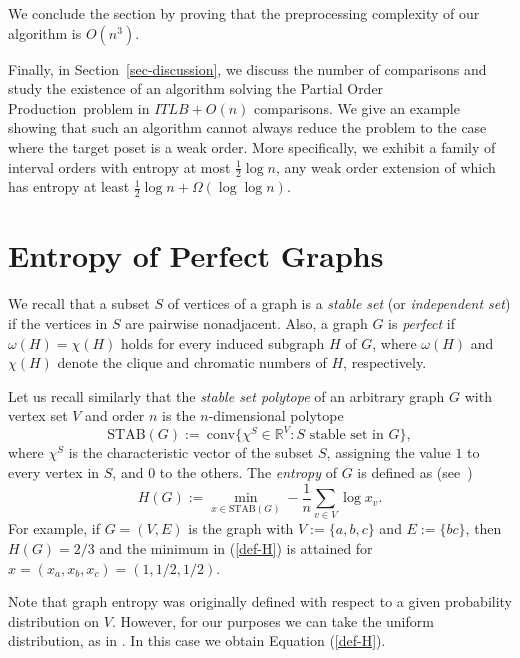 \documentclass[12pt,oneside]{article}
\newcommand{\partsort}{{\sc Partial Order Production}}
\newcommand{\STAB}{\mathrm{STAB}}
\begin{document}
We conclude the section by proving that the preprocessing complexity of our algorithm is $O(n^3)$.\smallskip

Finally, in Section~\ref{sec-discussion}, we discuss {the number of comparisons and study} the existence of an algorithm solving the \partsort\ problem in $ITLB + O(n)$ comparisons. We give an example showing that such an algorithm cannot always reduce the problem to the case where the target poset is a weak order. More specifically, we exhibit a family of interval orders with entropy at most $\frac{1}{2}\log n$, any weak order extension of which has entropy at least $\frac{1}{2}\log n + \Omega(\log \log n)$.

\section{Entropy of Perfect Graphs}
\label{sec-perfect-graphs}
We recall that a subset $S$ of vertices of a graph is a \emph{stable set} (or {\em independent set}) if the vertices in $S$ are pairwise nonadjacent. Also, a graph $G$ is {\em perfect} if $\omega(H)=\chi(H)$ holds for every induced
subgraph $H$ of $G$, where $\omega(H)$ and $\chi(H)$ denote the
clique and chromatic numbers of $H$, respectively.

Let us recall similarly that the {\em stable set polytope\/} of an arbitrary graph $G$ with vertex set $V$ and order $n$ is the $n$-dimensional polytope
\begin{equation*}
\STAB(G) := \mathrm{\ conv} \{\chi^S \in \mathbb{R}^V : S \textrm{ stable set in }G\},
\end{equation*}
where $\chi^S$ is the characteristic vector of the subset $S$, assigning the value $1$ to every vertex in $S$, and $0$ to the others. The {\em entropy\/} of $G$ is defined as (see~\cite{K73,CKLMS90})
\begin{equation}
\label{def-H}
H(G) := \min_{x\in \STAB(G)} - \frac 1n \sum_{v\in V} \log x_v.
\end{equation}
For example, if $G=(V,E)$ is the graph with $V := \{a,b,c\}$ and $E := \{bc\}$, then $H(G) = 2/3$ and the minimum in (\ref{def-H}) is attained for $x = (x_a,x_b,x_c) = (1,1/2,1/2)$.

Note that graph entropy was originally defined with respect to a given probability distribution on $V$. However, for our purposes we can take the uniform distribution, as in \cite{KK95}. In this case we obtain Equation (\ref{def-H}).
\end{document}
